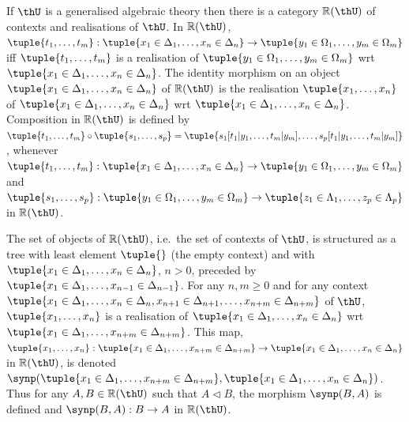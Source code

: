   If $\thU$ is a generalised algebraic theory then there is a category $\mathbb{R}(\thU)$ of contexts and realisations of $\thU$.
  In $\mathbb{R}(\thU)$, $\tuple{t_1, \dots, t_m} : \tuple{x_1 \in \Delta_1, \dots, x_n \in \Delta_n} \to \tuple{y_1 \in \Omega_1, \dots, y_m \in \Omega_m}$ iff $\tuple{t_1, \dots, t_m}$ is a realisation of $\tuple{y_1 \in \Omega_1, \dots, y_m \in \Omega_m}$ wrt $\tuple{x_1 \in \Delta_1, \dots, x_n \in \Delta_n}$.
  The identity morphism on an object $\tuple{x_1 \in \Delta_1, \dots, x_n \in \Delta_n}$ of $\mathbb{R}(\thU)$ is the realisation $\tuple{x_1, \dots, x_n}$ of $\tuple{x_1 \in \Delta_1, \dots, x_n \in \Delta_n}$ wrt $\tuple{x_1 \in \Delta_1, \dots, x_n \in \Delta_n}$.
  Composition in $\mathbb{R}(\thU)$ is defined by $\tuple{t_1, \dots, t_m} \circ \tuple{s_1, \dots, s_p} = \tuple{s_1[t_1|y_1, \dots, t_m|y_m], \dots, s_p[t_1|y_1, \dots, t_m|y_m]}$, whenever $\tuple{t_1, \dots, t_m} : \tuple{x_1 \in \Delta_1, \dots, x_n \in \Delta_n} \to \tuple{y_1 \in \Omega_1, \dots, y_m \in \Omega_m}$ and $\tuple{s_1, \dots, s_p} : \tuple{y_1 \in \Omega_1, \dots, y_m \in \Omega_m} \to \tuple{z_1 \in \Lambda_1, \dots, z_p \in \Lambda_p}$ in $\mathbb{R}(\thU)$.

  The set of objects of $\mathbb{R}(\thU)$, i.e.\ the set of contexts of $\thU$, is structured as a tree with least element $\tuple{}$ (the empty context) and with $\tuple{x_1 \in \Delta_1, \dots, x_n \in \Delta_n}$, $n > 0$, preceded by $\tuple{x_1 \in \Delta_1, \dots, x_{n-1} \in \Delta_{n-1}}$.
  For any $n,m \ge 0$ and for any context $\tuple{x_1 \in \Delta_1, \dots, x_n \in \Delta_n, x_{n+1} \in \Delta_{n+1}, \dots, x_{n+m} \in \Delta_{n+m}}$ of $\thU$, $\tuple{x_1, \dots, x_n}$ is a realisation of $\tuple{x_1 \in \Delta_1, \dots, x_n \in \Delta_n}$ wrt $\tuple{x_1 \in \Delta_1, \dots, x_{n+m} \in \Delta_{n+m}}$.
  This map, $\tuple{x_1, \dots, x_n} : \tuple{x_1 \in \Delta_1, \dots, x_{n+m} \in \Delta_{n+m}} \to \tuple{x_1 \in \Delta_1, \dots, x_n \in \Delta_n}$ in $\mathbb{R}(\thU)$, is denoted $\synp(\tuple{x_1 \in \Delta_1, \dots, x_{n+m} \in \Delta_{n+m}}, \tuple{x_1 \in \Delta_1, \dots, x_n \in \Delta_n})$.
  Thus for any $A, B \in \mathbb{R}(\thU)$ such that $A \triangleleft B$, the morphism $\synp(B,A)$ is defined and $\synp(B,A) : B \to A$ in $\mathbb{R}(\thU)$.

